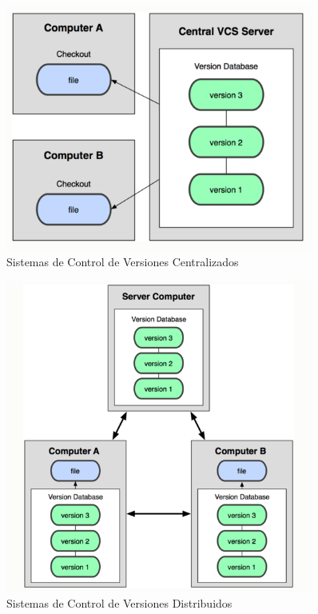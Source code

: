 \begin{enumerate}
\begin{figure}
\begin{center}
  \includegraphics[width=0.9\textwidth]{Imagenes/grafico2.png}
\caption{Sistemas de Control de Versiones Centralizados}
\end{center}
\end{figure}

\begin{figure}
\begin{center}
  \includegraphics[width=0.9\textwidth]{Imagenes/grafico3.png}
\caption{Sistemas de Control de Versiones Distribuidos}
\end{center}
\end{figure}

\end{enumerate}



